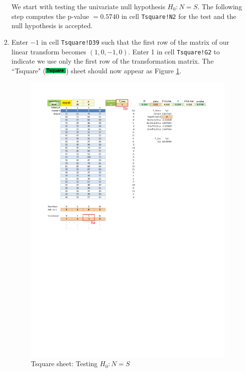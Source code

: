 \documentclass[article]{jss}
\newcommand{\shtTsquare}{``Tsquare" (\includegraphics[height=8pt, keepaspectratio=true]{TsquareSheetTab_png}) }
\begin{document}
\begin{enumerate}
                We start with testing the univariate null hypothesis $H_0: N = S$. The following step computes the p-value $=0.5740$ in cell \texttt{Tsquare!N2} for the test and the null hypothesis is accepted.
                \item Enter $-1$ in cell \texttt{Tsquare!D39} such that the first row of the matrix of our linear transform becomes $(1,0,-1,0)$. Enter 1 in cell \texttt{Tsquare!G2} to indicate we use only the first row of the transformation matrix. The \shtTsquare sheet should now appear as Figure \ref{fig:Tsquare_N=S}.
                \begin{figure}[tbh]
                	\includegraphics[width=\linewidth,keepaspectratio=true]{img/TsquareSheetOutput_markup}
                	\vspace{-25pt}\centering\protect\caption{Tsquare sheet: Testing $H_0: N = S$}\label{fig:Tsquare_N=S}
                \end{figure}
                

\end{enumerate}
\end{document}
